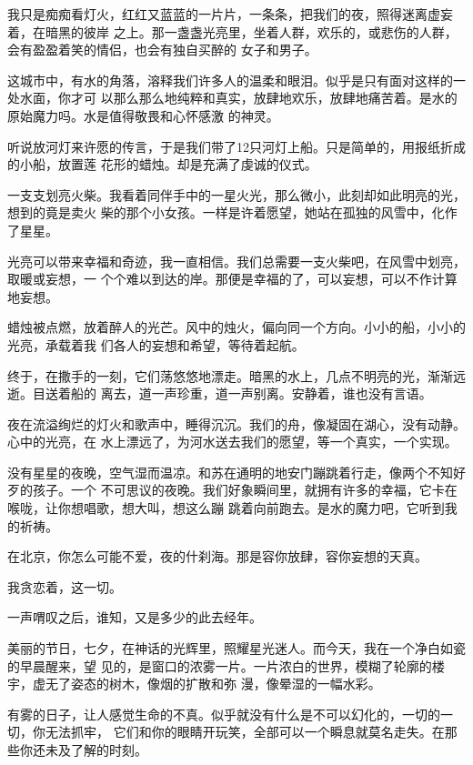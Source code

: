 \documentclass[12pt,a4paper]{article}
\begin{document}
		我只是痴痴看灯火，红红又蓝蓝的一片片，一条条，把我们的夜，照得迷离虚妄着，在暗黑的彼岸
	之上。那一盏盏光亮里，坐着人群，欢乐的，或悲伤的人群，会有盈盈着笑的情侣，也会有独自买醉的
	女子和男子。

		这城市中，有水的角落，溶释我们许多人的温柔和眼泪。似乎是只有面对这样的一处水面，你才可
	以那么那么地纯粹和真实，放肆地欢乐，放肆地痛苦着。是水的原始魔力吗。水是值得敬畏和心怀感激
	的神灵。

		听说放河灯来许愿的传言，于是我们带了12只河灯上船。只是简单的，用报纸折成的小船，放置莲
	花形的蜡烛。却是充满了虔诚的仪式。

		一支支划亮火柴。我看着同伴手中的一星火光，那么微小，此刻却如此明亮的光，想到的竟是卖火
	柴的那个小女孩。一样是许着愿望，她站在孤独的风雪中，化作了星星。

		光亮可以带来幸福和奇迹，我一直相信。我们总需要一支火柴吧，在风雪中划亮，取暖或妄想，一
	个个难以到达的岸。那便是幸福的了，可以妄想，可以不作计算地妄想。

		蜡烛被点燃，放着醉人的光芒。风中的烛火，偏向同一个方向。小小的船，小小的光亮，承载着我
	们各人的妄想和希望，等待着起航。

		终于，在撒手的一刻，它们荡悠悠地漂走。暗黑的水上，几点不明亮的光，渐渐远逝。目送着船的
	离去，道一声珍重，道一声别离。安静着，谁也没有言语。

		夜在流溢绚烂的灯火和歌声中，睡得沉沉。我们的舟，像凝固在湖心，没有动静。心中的光亮，在
	水上漂远了，为河水送去我们的愿望，等一个真实，一个实现。

		没有星星的夜晚，空气湿而温凉。和苏在通明的地安门蹦跳着行走，像两个不知好歹的孩子。一个
	不可思议的夜晚。我们好象瞬间里，就拥有许多的幸福，它卡在喉咙，让你想唱歌，想大叫，想这么蹦
	跳着向前跑去。是水的魔力吧，它听到我的祈祷。

		在北京，你怎么可能不爱，夜的什刹海。那是容你放肆，容你妄想的天真。

		我贪恋着，这一切。

	\endwriting



		一声喟叹之后，谁知，又是多少的此去经年。


		美丽的节日，七夕，在神话的光辉里，照耀星光迷人。而今天，我在一个净白如瓷的早晨醒来，望
	见的，是窗口的浓雾一片。一片浓白的世界，模糊了轮廓的楼宇，虚无了姿态的树木，像烟的扩散和弥
	漫，像晕湿的一幅水彩。

		有雾的日子，让人感觉生命的不真。似乎就没有什么是不可以幻化的，一切的一切，你无法抓牢，
	它们和你的眼睛开玩笑，全部可以一个瞬息就莫名走失。在那些你还未及了解的时刻。
\end{document}
